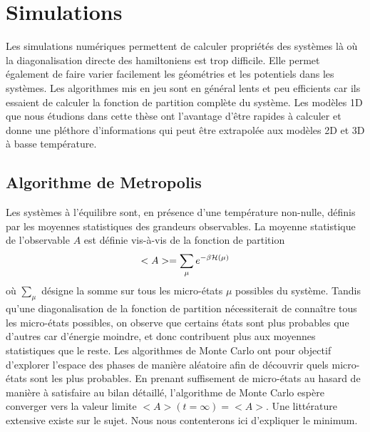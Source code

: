 \chapter{Simulations}

Les simulations numériques permettent de calculer propriétés des systèmes là où la diagonalisation directe des hamiltoniens est trop difficile. Elle permet également de faire varier facilement les géométries et les potentiels dans les systèmes. Les algorithmes mis en jeu sont en général lents et peu efficients car ils essaient de calculer la fonction de partition complète du système. Les modèles 1D que nous étudions dans cette thèse ont l'avantage d'être rapides à calculer et donne une pléthore d'informations qui peut être extrapolée aux modèles 2D et 3D à basse température. 

\section{Algorithme de Metropolis}

Les systèmes à l'équilibre sont, en présence d'une température non-nulle, définis par les moyennes statistiques des grandeurs observables. La moyenne statistique de l'observable $A$ est définie vis-à-vis de la fonction de partition
\begin{align}
	<A> = \sum_\mu e^{-\beta \mathcal{H}(\mu)}
\end{align}
où $\sum_\mu$ désigne la somme sur tous les micro-états $\mu$ possibles du système. Tandis qu'une diagonalisation de la fonction de partition nécessiterait de connaître tous les micro-états possibles, on observe que certains états sont plus probables que d'autres car d'énergie moindre, et donc contribuent plus aux moyennes statistiques que le reste. 
Les algorithmes de Monte Carlo ont pour objectif d'explorer l'espace des phases de manière aléatoire afin de découvrir quels micro-états sont les plus probables. En prenant suffisement de micro-états au hasard de manière à satisfaire au bilan détaillé, l'algorithme de Monte Carlo espère converger vers la valeur limite $<A>(t=\infty) = <A>$.
Une littérature extensive\cite{barkema} existe sur le sujet. Nous nous contenterons ici d'expliquer le minimum. 

